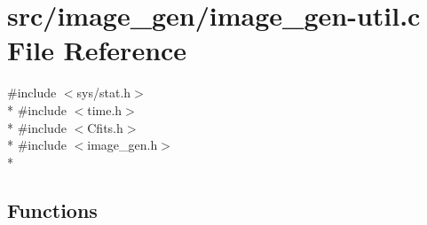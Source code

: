 \hypertarget{image__gen-util_8c}{\section{src/image\+\_\+gen/image\+\_\+gen-\/util.c File Reference}
\label{image__gen-util_8c}
}
{\ttfamily \#include $<$sys/stat.\+h$>$}\\*
{\ttfamily \#include $<$time.\+h$>$}\\*
{\ttfamily \#include $<$Cfits.\+h$>$}\\*
{\ttfamily \#include $<$image\+\_\+gen.\+h$>$}\\*
\subsection*{Functions}
